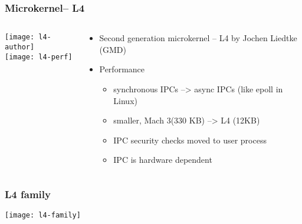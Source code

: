 \begin{frame}[plain]
	\frametitle{Microkernel-- L4}
	
	
	\begin{columns}
		
		\begin{column}{.4\textwidth}
			\centering
			\texttt{[image: l4-author]}
			\\
			\texttt{[image: l4-perf]}
		\end{column}
		
		\begin{column}{.6\textwidth}
			
			\begin{itemize}
				\item Second generation microkernel -- L4 by Jochen Liedtke (GMD)
				\item Performance
				\begin{itemize}
					\item synchronous IPCs  -->  async IPCs (like epoll in Linux)
					\item smaller, Mach 3(330 KB) --> L4 (12KB)
					\item IPC security checks moved to user process
					\item IPC is hardware dependent
				\end{itemize}		
			\end{itemize}	
			
		\end{column}
		
		
	\end{columns}
	
\end{frame}


\begin{frame}[plain]
	\frametitle{L4 family}
	
	\centering
	\texttt{[image: l4-family]}
	
\end{frame}



